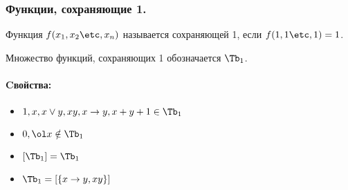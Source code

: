 \documentclass[unicode, 10pt, a4paper, oneside, fleqn]{article}
\begin{document}
\subsubsection{Функции, сохраняющие 1.}
\begin{df}
  Функция $f(\set[x]{n})$ называется сохраняющей 1, если $f(1,1\etc,1)=1$.
\end{df}
\begin{denote}
  Множество функций, сохраняющих 1 обозначается $\Tb_1$.
\end{denote}
\paragraph{Cвойства:}
\begin{itemize}
  \item $1, x,\dn,xy,x\to y,x+y+1 \in\Tb_1$
  \item $0,\ol x \notin\Tb_1$
  \item $[\Tb_1]=\Tb_1$
  \item $\Tb_1=\cls{x\to y, xy}$
\end{itemize}
\end{document}
